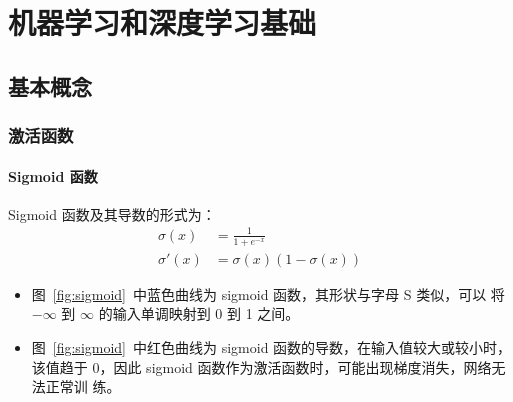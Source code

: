 \part{机器学习和深度学习基础}
\chapter{基本概念}
\section{激活函数}

\subsection{Sigmoid 函数}
\label{subsec:Sigmoid}

Sigmoid 函数及其导数的形式为：
\begin{align}
  \label{equ:sigmoid}
  \sigma(x) & = \frac{1}{1 + e^{-x}} \\
  \label{equ:sigmoid-d}
  \sigma'(x) & = \sigma(x) (1-\sigma(x))
\end{align}


\begin{itemize}
  \item 图~\ref{fig:sigmoid}~中蓝色曲线为 sigmoid 函数，其形状与字母 S 类似，可以
    将 $-\infty$ 到 $\infty$ 的输入单调映射到 0 到 1 之间。
  \item 图~\ref{fig:sigmoid}~中红色曲线为 sigmoid 函数的导数，在输入值较大或较小时，
    该值趋于 0，因此 sigmoid 函数作为激活函数时，可能出现梯度消失，网络无法正常训
    练。
\end{itemize}

